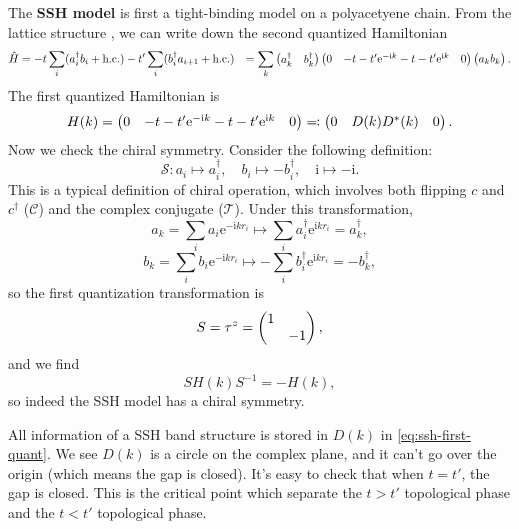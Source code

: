 \documentclass[hyperref, a4paper]{article}
\newcommand*{\ii}{\mathrm{i}}
\newcommand*{\ee}{\mathrm{e}}
\newcommand*{\concept}[1]{{\textbf{#1}}}
\def\\{}%
\begin{document}
The \concept{SSH model} is first a tight-binding model on a polyacetyene chain. From the lattice structure 
, we can write down the second quantized Hamiltonian
\begin{equation}
    \begin{aligned}
        \hat{H} &= - t \sum_i (a_i^\dagger b_i + \text{h.c.}) - t' \sum_i (b^\dagger_i a_{i+1} + \text{h.c.}) \\
        &= \sum_k \pmqty{a^\dagger_k & b^\dagger_k} \pmqty{0 & - t - t' \ee^{- \ii k} \\ - t - t' \ee^{\ii k} & 0} \pmqty{a_k \\ b_k}.
    \end{aligned}
\end{equation}
The first quantized Hamiltonian is 
\begin{equation}
    H(k) = \pmqty{0 & - t - t' \ee^{- \ii k} \\ - t - t' \ee^{\ii k} & 0} \eqqcolon \pmqty{0 & D(k) \\ D^*(k) & 0}.
    \label{eq:ssh-first-quant}
\end{equation}
Now we check the chiral symmetry. Consider the following definition:
\begin{equation}
    \mathcal{S} : a_i \mapsto a_i^\dagger, \quad b_i \mapsto - b_i^\dagger, \quad \ii \mapsto - \ii.
\end{equation}
This is a typical definition of chiral operation, which involves both flipping $c$ and $c^\dagger$ 
($\mathcal{C}$) and the complex conjugate ($\mathcal{T}$). Under this transformation,
\begin{equation}
    a_k = \sum_i a_i \ee^{- \ii k r_i} \mapsto \sum_i a_i^\dagger \ee^{\ii k r_i} = a_k^\dagger,
\end{equation}
\begin{equation}
    b_k = \sum_i b_i \ee^{- \ii k r_i} \mapsto - \sum_i b_i^\dagger \ee^{\ii k r_i} = - b_k^\dagger,
\end{equation}
so the first quantization transformation is 
\begin{equation}
    S = \tau^z = \pmqty{\dmat{1, -1}},
\end{equation}
and we find 
\begin{equation}
    S H(k) S^{-1} = - H(k),
\end{equation}
so indeed the SSH model has a chiral symmetry. 

All information of a SSH band structure is stored in $D(k)$ in \eqref{eq:ssh-first-quant}. We see $D(k)$
is a circle on the complex plane, and it can't go over the origin (which means the gap is closed).
It's easy to check that when $t = t'$, the gap is closed. This is the critical point which separate the 
$t > t'$ topological phase and the $t < t'$ topological phase. 
\end{document}
